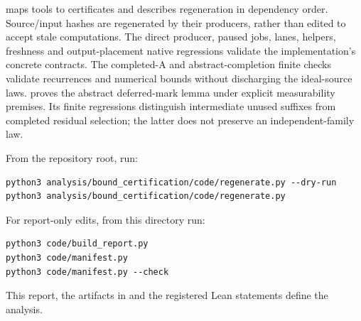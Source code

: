 \documentclass[11pt]{article}
\theoremstyle{definition}
\theoremstyle{remark}
\begin{document}
 maps tools to certificates and describes
regeneration in dependency order. Source/input hashes are regenerated by
their producers, rather than edited to accept stale computations. The direct
producer, paused jobs, lanes, helpers, freshness and output-placement native
regressions validate the implementation's concrete contracts. The completed-A
and abstract-completion finite checks validate recurrences and numerical
bounds without discharging the ideal-source laws.
 proves the abstract deferred-mark lemma
under explicit measurability premises. Its finite regressions distinguish
intermediate unused suffixes from completed residual selection; the latter
does not preserve an independent-family law.

From the repository root, run:
\begin{verbatim}
python3 analysis/bound_certification/code/regenerate.py --dry-run
python3 analysis/bound_certification/code/regenerate.py
\end{verbatim}
For report-only edits, from this directory run:
\begin{verbatim}
python3 code/build_report.py
python3 code/manifest.py
python3 code/manifest.py --check
\end{verbatim}
This report, the artifacts in  and the registered Lean statements
define the analysis.
\end{document}
